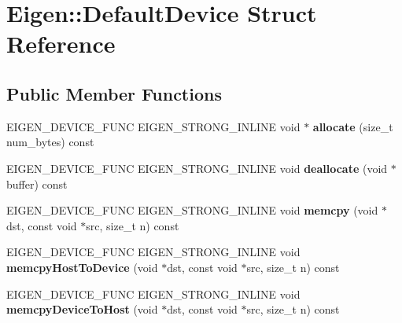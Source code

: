\hypertarget{struct_eigen_1_1_default_device}{}\section{Eigen\+:\+:Default\+Device Struct Reference}
\label{struct_eigen_1_1_default_device}
\subsection*{Public Member Functions}
\begin{DoxyCompactItemize}
\item 
\mbox{\label{struct_eigen_1_1_default_device_a4e7a567011fa78c87f4c3737883af280}} 
E\+I\+G\+E\+N\+\_\+\+D\+E\+V\+I\+C\+E\+\_\+\+F\+U\+NC E\+I\+G\+E\+N\+\_\+\+S\+T\+R\+O\+N\+G\+\_\+\+I\+N\+L\+I\+NE void $\ast$ {\bfseries allocate} (size\+\_\+t num\+\_\+bytes) const
\item 
\mbox{\label{struct_eigen_1_1_default_device_a37161c54e19b871cdffadbbc0e4bea12}} 
E\+I\+G\+E\+N\+\_\+\+D\+E\+V\+I\+C\+E\+\_\+\+F\+U\+NC E\+I\+G\+E\+N\+\_\+\+S\+T\+R\+O\+N\+G\+\_\+\+I\+N\+L\+I\+NE void {\bfseries deallocate} (void $\ast$buffer) const
\item 
\mbox{\label{struct_eigen_1_1_default_device_a61984e9d6b70218273aea25952877bef}} 
E\+I\+G\+E\+N\+\_\+\+D\+E\+V\+I\+C\+E\+\_\+\+F\+U\+NC E\+I\+G\+E\+N\+\_\+\+S\+T\+R\+O\+N\+G\+\_\+\+I\+N\+L\+I\+NE void {\bfseries memcpy} (void $\ast$dst, const void $\ast$src, size\+\_\+t n) const
\item 
\mbox{\label{struct_eigen_1_1_default_device_a978f0e67b69d1142d28c7c314c71ea9d}} 
E\+I\+G\+E\+N\+\_\+\+D\+E\+V\+I\+C\+E\+\_\+\+F\+U\+NC E\+I\+G\+E\+N\+\_\+\+S\+T\+R\+O\+N\+G\+\_\+\+I\+N\+L\+I\+NE void {\bfseries memcpy\+Host\+To\+Device} (void $\ast$dst, const void $\ast$src, size\+\_\+t n) const
\item 
\mbox{\label{struct_eigen_1_1_default_device_a4be26c1b7f78e27670975bafdfc75e68}} 
E\+I\+G\+E\+N\+\_\+\+D\+E\+V\+I\+C\+E\+\_\+\+F\+U\+NC E\+I\+G\+E\+N\+\_\+\+S\+T\+R\+O\+N\+G\+\_\+\+I\+N\+L\+I\+NE void {\bfseries memcpy\+Device\+To\+Host} (void $\ast$dst, const void $\ast$src, size\+\_\+t n) const

\end{DoxyCompactItemize}
